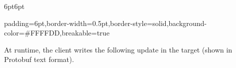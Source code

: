 \documentclass[11pt]{article}
\begin{document}
{%
\begin{mdbmargintb}{6pt}{6pt}%
\begin{mdblock}{padding=6pt,border-width=0.5pt,border-style=solid,background-color=\#FFFFDD,breakable=true}%
\begin{mdpre}%
\end{mdpre}%
\end{mdblock}%
\end{mdbmargintb}%

\noindent{}At runtime, the client writes the following update in the target (shown in
Protobuf text format).%

}
\end{document}

